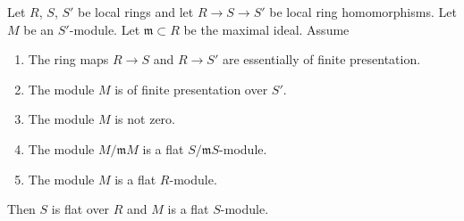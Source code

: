 \begin{lemma}
\label{lemma-criterion-flatness-fibre}
Let $R$, $S$, $S'$ be local rings and let $R \to S \to S'$ be local ring
homomorphisms. Let $M$ be an $S'$-module. Let $\mathfrak m \subset R$
be the maximal ideal. Assume
\begin{enumerate}
\item The ring maps $R \to S$ and $R \to S'$ are essentially
of finite presentation.
\item The module $M$ is of finite presentation over $S'$.
\item The module $M$ is not zero.
\item The module $M/\mathfrak mM$ is a flat $S/\mathfrak mS$-module.
\item The module $M$ is a flat $R$-module.
\end{enumerate}
Then $S$ is flat over $R$ and $M$ is a flat $S$-module.
\end{lemma}

